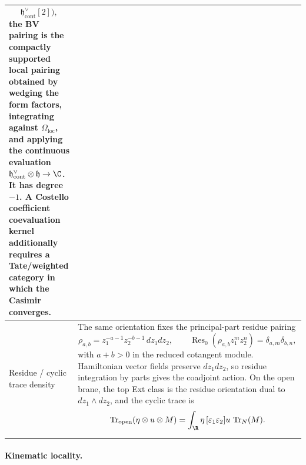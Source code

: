 \begin{longtable}{@{}>{\raggedright\arraybackslash}p{}
  >{\raggedright\arraybackslash}p{}@{}}
\[  \mathfrak h^\vee_{\mathrm{cont}}[2]\bigr),
\]
the BV pairing is the compactly supported local pairing obtained by
wedging the form factors, integrating against
\(\Omega_{\mathrm{loc}}\), and applying the continuous evaluation
\(\mathfrak h^\vee_{\mathrm{cont}}\otimes\mathfrak h\to\C\).  It has
degree \(-1\).  A Costello coefficient coevaluation kernel additionally
requires a Tate/weighted category in which the Casimir converges.\\
\hline
Residue / cyclic trace density &
The same orientation fixes the principal-part residue pairing
\[
  \rho_{a,b}=z_1^{-a-1}z_2^{-b-1}\,dz_1dz_2,\qquad
  \operatorname{Res}_0(\rho_{a,b}z_1^mz_2^n)
    =\delta_{a,m}\delta_{b,n},
\]
with \(a+b>0\) in the reduced cotangent module.  Hamiltonian vector
fields preserve \(dz_1dz_2\), so residue integration by parts gives the
coadjoint action.  On the open brane, the top Ext class is the residue
orientation dual to \(dz_1\wedge dz_2\), and the cyclic trace is
\[
  \operatorname{Tr}_{\mathrm{open}}(\eta\otimes u\otimes M)
  =\int_\R\eta\,[\varepsilon_1\varepsilon_2]u\,
    \operatorname{Tr}_N(M).
\]\\
\hline
\end{longtable}

\paragraph{Kinematic locality.}

